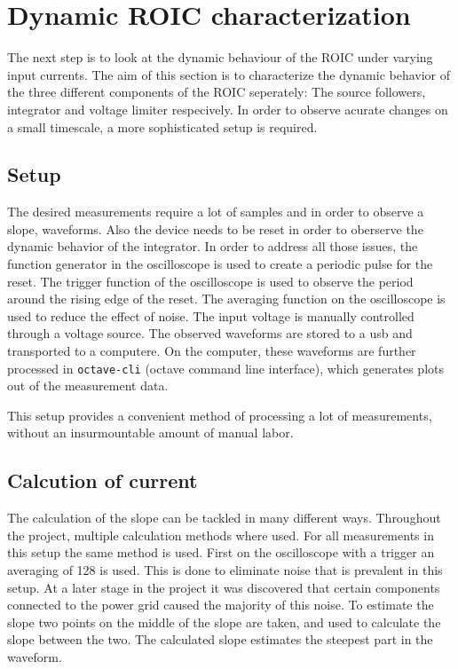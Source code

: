 \section{Dynamic ROIC characterization}\label{sec:dynamic_ROIC_characterization}
The next step is to look at the dynamic behaviour of the ROIC under varying input currents. The aim of this section is to characterize the dynamic behavior of the three different components of the ROIC seperately: The source followers, integrator and voltage limiter respecively. In order to observe acurate changes on a small timescale, a more sophisticated setup is required.


\subsection{Setup}\label{ssec:dynamic_setup}
The desired measurements require a lot of samples and in order to observe a slope, waveforms. Also the device needs to be reset in order to oberserve the dynamic behavior of the integrator. In order to address all those issues, the function generator in the oscilloscope is used to create a periodic pulse for the reset. The trigger function of the oscilloscope is used to observe the period around the rising edge of the reset. The averaging function on the oscilloscope is used to reduce the effect of noise. The input voltage is manually controlled through a voltage source. The observed waveforms are stored to a usb and transported to a computere. On the computer, these waveforms are further processed in \texttt{octave-cli} (octave command line interface), which generates plots out of the measurement data. 

This setup provides a convenient method of processing a lot of measurements, without an insurmountable amount of manual labor.

\subsection{Calcution of current}
The calculation of the slope can be tackled in many different ways. Throughout the project, multiple calculation methods where used. For all measurements in this setup the same method is used. First on the oscilloscope with a trigger an averaging of 128 is used. This is done to eliminate noise that is prevalent in this setup. At a later stage in the project it was discovered that certain components connected to the power grid caused the majority of this noise. To estimate the slope two points on the middle of the slope are taken, and used to calculate the slope between the two. The calculated slope estimates the steepest part in the waveform.

